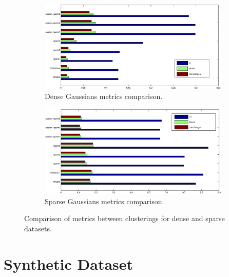 \begin{figure}
    \centering
    \begin{subfigure}[b]{1\textwidth}
        \includegraphics[width=\textwidth]{dense_gaussians_metrics2}
        \caption{Dense Gaussians metrics comparison.}
        \label{fig:dense_gaussians_metrics}
    \end{subfigure}
    \quad
    \begin{subfigure}[b]{1\textwidth}
        \includegraphics[width=\textwidth]{sparse_gaussians_metrics2}
        \caption{Sparse Gaussians metrics comparison.}
        \label{fig:sparse_gaussians_metrics}
    \end{subfigure}
    \caption{Comparison of metrics between clusterings for dense and sparse datasets.}
    \label{fig:gaussians_metrics}
\end{figure}

\section{Synthetic Dataset}

